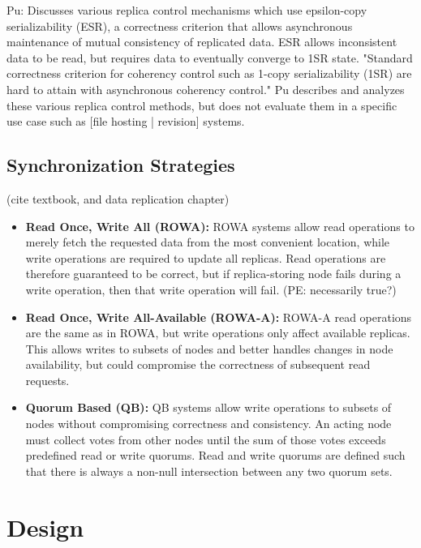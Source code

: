 Pu: Discusses various replica control mechanisms which use epsilon-copy serializability (ESR), a correctness criterion that allows asynchronous maintenance of mutual consistency of replicated data. ESR allows inconsistent data to be read, but requires data to eventually converge to 1SR state.
"Standard correctness criterion for coherency control such as 1-copy serializability (1SR) are hard to attain with asynchronous coherency control."
Pu describes and analyzes these various replica control methods, but does not evaluate them in a specific use case such as [file hosting | revision] systems.

\subsection{Synchronization Strategies}
(cite textbook, and data replication chapter)
\begin{itemize}
\item \textbf{Read Once, Write All (ROWA):} ROWA systems allow read operations to merely fetch the requested data from the most convenient location, while write operations are required to update all replicas. 
Read operations are therefore guaranteed to be correct, but if replica-storing node fails during a write operation, then that write operation will fail. (PE: necessarily true?)
\item \textbf{Read Once, Write All-Available (ROWA-A):} ROWA-A read operations are the same as in ROWA, but write operations only affect available replicas. 
This allows writes to subsets of nodes and better handles changes in node availability, but could compromise the correctness of subsequent read requests.
\item \textbf{Quorum Based (QB):} QB systems allow write operations to subsets of nodes without compromising correctness and consistency. An acting node must collect votes from other nodes until the sum of those votes exceeds predefined read or write quorums.  Read and write quorums are defined such that there is always a non-null intersection between any two quorum sets.
\end{itemize}

\section{Design}
